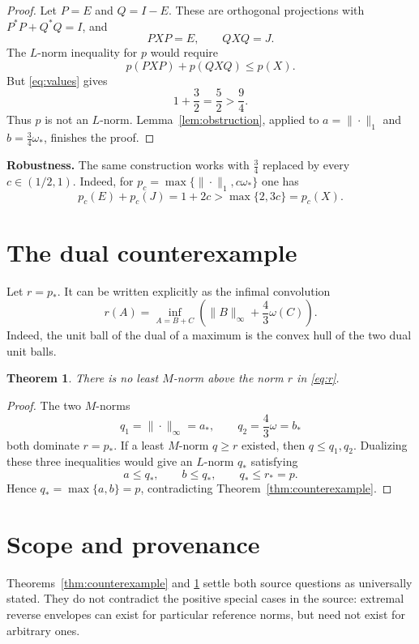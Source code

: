 \documentclass[11pt]{article}
\newtheorem{theorem}{Theorem}
\begin{document}
\begin{proof}
Let $P=E$ and $Q=I-E$.  These are orthogonal projections with
$P^*P+Q^*Q=I$, and
\[
 PXP=E,\qquad QXQ=J.
\]
The $L$-norm inequality for $p$ would require
\[
 p(PXP)+p(QXQ)\leq p(X).
\]
But \eqref{eq:values} gives
\[
 1+\frac32=\frac52>\frac94.
\]
Thus $p$ is not an $L$-norm.  Lemma~\ref{lem:obstruction}, applied to
$a=\|\cdot\|_1$ and $b=\tfrac34\omega_*$, finishes the proof.
\end{proof}

\noindent\textbf{Robustness.}
The same construction works with $\tfrac34$ replaced by every
$c\in(1/2,1)$.  Indeed, for
$p_c=\max\{\|\cdot\|_1,c\omega_*\}$ one has
\[
 p_c(E)+p_c(J)=1+2c>\max\{2,3c\}=p_c(X).
\]

\section{The dual counterexample}

Let $r=p_*$.  It can be written explicitly as the infimal convolution
\begin{equation}\label{eq:r}
 r(A)=\inf_{A=B+C}
 \left(\|B\|_\infty+\frac43\omega(C)\right).
\end{equation}
Indeed, the unit ball of the dual of a maximum is the convex hull of the two
dual unit balls.

\begin{theorem}\label{thm:dual}
There is no least $M$-norm above the norm $r$ in \eqref{eq:r}.
\end{theorem}

\begin{proof}
The two $M$-norms
\[
 q_1=\|\cdot\|_\infty=a_*,
 \qquad q_2=\frac43\omega=b_*
\]
both dominate $r=p_*$.  If a least $M$-norm $q\geq r$ existed, then
$q\leq q_1,q_2$.  Dualizing these three inequalities would give an $L$-norm
$q_*$ satisfying
\[
 a\leq q_*,\qquad b\leq q_*,\qquad q_*\leq r_*=p.
\]
Hence $q_*=\max\{a,b\}=p$, contradicting
Theorem~\ref{thm:counterexample}.
\end{proof}

\section{Scope and provenance}

Theorems~\ref{thm:counterexample} and \ref{thm:dual} settle both source
questions as universally stated.  They do not contradict the positive
special cases in the source: extremal reverse envelopes can exist for
particular reference norms, but need not exist for arbitrary ones.
\end{document}
